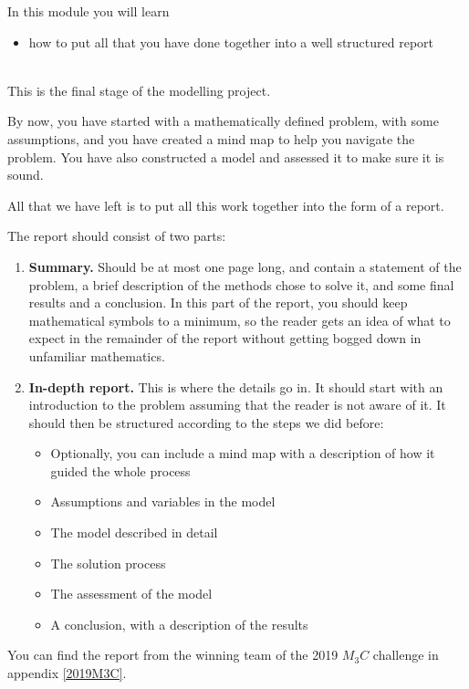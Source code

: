 \begin{siam}
In this module you will learn
\begin{itemize}
	\item how to put all that you have done together into a well structured report
\end{itemize}

\hfill \\



This is the final stage of the modelling project.

By now, you have started with a mathematically defined problem, with some assumptions, and you have created a mind map to help you navigate the problem.
You have also constructed a model and assessed it to make sure it is sound.

All that we have left is to put all this work together into the form of a report.



The report should consist of two parts:

\begin{enumerate}
	\item \textbf{Summary. } Should be at most one page long, and contain a statement of the problem, a brief description of the methods chose to solve it, and some final results and a conclusion. In this part of the report, you should keep mathematical symbols to a minimum, so the reader gets an idea of what to expect in the remainder of the report without getting bogged down in unfamiliar mathematics.

	\item \textbf{In-depth report. } This is where the details go in. It should start with an introduction to the problem assuming that the reader is not aware of it. It should then be structured according to the steps we did before:
	\begin{itemize}
		\item Optionally, you can include a mind map with a description of how it guided the whole process
		\item Assumptions and variables in the model
		\item The model described in detail
		\item The solution process
		\item The assessment of the model
		\item A conclusion, with a description of the results
	\end{itemize}
\end{enumerate}



\begin{example}
You can find the report from the winning team of the 2019 $M_3C$ challenge in appendix \ref{2019M3C}.
	
\end{example}

\end{siam}


